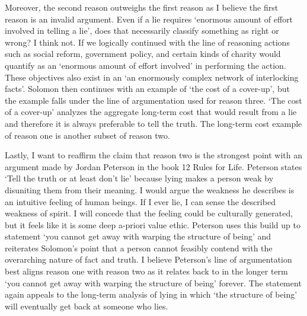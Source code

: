 \documentclass[12pt]{article}
\begin{document}
Moreover, the second reason outweighs the first reason as I believe the first
reason is an invalid argument. Even if a lie requires `enormous amount of effort
involved in telling a lie', does that necessarily classify something as right or
wrong? I think not. If we logically continued with the line of reasoning actions
such as social reform, government policy, and certain kinds of charity would
quantify as an `enormous amount of effort involved' in performing the action.
These objectives also exist in an `an enormously complex network of interlocking
facts'. Solomon then continues with an example of `the cost of a cover-up', but
the example falls under the line of argumentation used for reason three. `The
cost of a cover-up' analyzes the aggregate long-term cost that would result from
a lie and therefore it is always preferable to tell the truth. The long-term
cost example of reason one is another subset of reason two.

Lastly, I want to reaffirm the claim that reason two is the strongest point with
an argument made by Jordan Peterson in the book 12 Rules for Life. Peterson
states `Tell the truth or at least don't lie' because lying makes a person weak
by disuniting them from their meaning. I would argue the weakness he describes
is an intuitive feeling of human beings. If I ever lie, I can sense the
described weakness of spirit. I will concede that the feeling could be
culturally generated, but it feels like it is some deep a-priori value ethic.
Peterson uses this build up to statement `you cannot get away with warping the
structure of being' and reiterates Solomon's point that a person cannot feasibly
contend with the overarching nature of fact and truth. I believe Peterson's line
of argumentation best aligns reason one with reason two as it relates back to in
the longer term `you cannot get away with warping the structure of
being' forever. The statement again appeals to the long-term analysis of lying
in which `the structure of being' will eventually get back at someone who
lies.~\cite{peterson}



\end{document}
